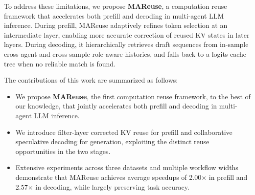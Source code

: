 \documentclass[letterpaper]{article} %
\begin{document}

To address these limitations, we propose \textbf{MAReuse}, a computation reuse framework that accelerates both prefill and decoding in multi-agent LLM inference. During prefill, MAReuse adaptively refines token selection at an intermediate layer, enabling more accurate correction of reused KV states in later layers. During decoding, it hierarchically retrieves draft sequences from in-sample cross-agent and cross-sample role-aware histories, and falls back to a logits-cache tree when no reliable match is found.

The contributions of this work are summarized as follows:
\begin{itemize}
	\item We propose \textbf{MAReuse}, the first computation reuse framework, to the best of our knowledge, that jointly accelerates both prefill and decoding in multi-agent LLM inference.
	
	\item We introduce filter-layer corrected KV reuse for prefill and collaborative speculative decoding for generation, exploiting the distinct reuse opportunities in the two stages. 
	
	\item Extensive experiments across three datasets and multiple workflow widths demonstrate that MAReuse achieves average speedups of 2.00$\times$ in prefill and 2.57$\times$ in decoding, while largely preserving task accuracy.
	
%	
\end{itemize}
\end{document}
